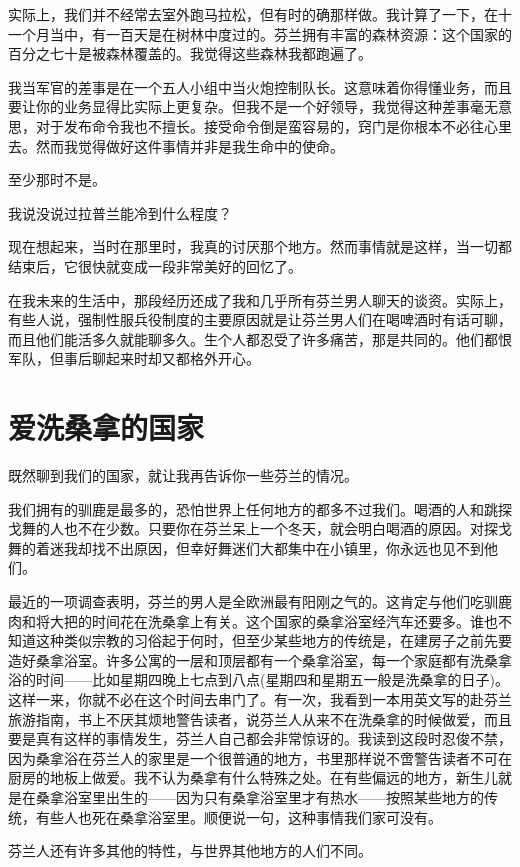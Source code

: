 实际上，我们并不经常去室外跑马拉松，但有时的确那样做。我计算了一下，在十一个月当中，有一百天是在树林中度过的。芬兰拥有丰富的森林资源：这个国家的百分之七十是被森林覆盖的。我觉得这些森林我都跑遍了。

我当军官的差事是在一个五人小组中当火炮控制队长。这意味着你得懂业务，而且要让你的业务显得比实际上更复杂。但我不是一个好领导，我觉得这种差事毫无意思，对于发布命令我也不擅长。接受命令倒是蛮容易的，窍门是你根本不必往心里去。然而我觉得做好这件事情并非是我生命中的使命。

至少那时不是。

我说没说过拉普兰能冷到什么程度？

现在想起来，当时在那里时，我真的讨厌那个地方。然而事情就是这样，当一切都结束后，它很快就变成一段非常美好的回忆了。

在我未来的生活中，那段经历还成了我和几乎所有芬兰男人聊天的谈资。实际上，有些人说，强制性服兵役制度的主要原因就是让芬兰男人们在喝啤酒时有话可聊，而且他们能活多久就能聊多久。生个人都忍受了许多痛苦，那是共同的。他们都恨军队，但事后聊起来时却又都格外开心。

 
\section{爱洗桑拿的国家}

既然聊到我们的国家，就让我再告诉你一些芬兰的情况。

我们拥有的驯鹿是最多的，恐怕世界上任何地方的都多不过我们。喝酒的人和跳探戈舞的人也不在少数。只要你在芬兰呆上一个冬天，就会明白喝酒的原因。对探戈舞的着迷我却找不出原因，但幸好舞迷们大都集中在小镇里，你永远也见不到他们。

最近的一项调查表明，芬兰的男人是全欧洲最有阳刚之气的。这肯定与他们吃驯鹿肉和将大把的时间花在洗桑拿上有关。这个国家的桑拿浴室经汽车还要多。谁也不知道这种类似宗教的习俗起于何时，但至少某些地方的传统是，在建房子之前先要造好桑拿浴室。许多公寓的一层和顶层都有一个桑拿浴室，每一个家庭都有洗桑拿浴的时间——比如星期四晚上七点到八点(星期四和星期五一般是洗桑拿的日子)。这样一来，你就不必在这个时间去串门了。有一次，我看到一本用英文写的赴芬兰旅游指南，书上不厌其烦地警告读者，说芬兰人从来不在洗桑拿的时候做爱，而且要是真有这样的事情发生，芬兰人自己都会非常惊讶的。我读到这段时忍俊不禁，因为桑拿浴在芬兰人的家里是一个很普通的地方，书里那样说不啻警告读者不可在厨房的地板上做爱。我不认为桑拿有什么特殊之处。在有些偏远的地方，新生儿就是在桑拿浴室里出生的——因为只有桑拿浴室里才有热水——按照某些地方的传统，有些人也死在桑拿浴室里。顺便说一句，这种事情我们家可没有。

芬兰人还有许多其他的特性，与世界其他地方的人们不同。

